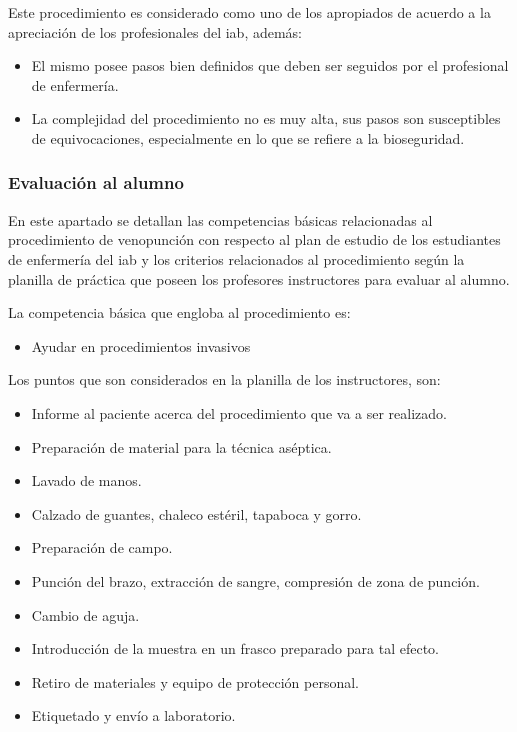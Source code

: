 Este procedimiento es considerado como uno de los apropiados de acuerdo a la
apreciación de los profesionales del \Gls{iab}, además: 

\begin{itemize}
\item El mismo posee pasos bien definidos que deben ser seguidos por el
    profesional de enfermería.
\item La complejidad del procedimiento no es muy alta, sus pasos son
    susceptibles de equivocaciones, especialmente en lo que se refiere a la
    bioseguridad. 
\end{itemize}



\subsubsection{Evaluación al alumno}


En este apartado se detallan las competencias básicas relacionadas al procedimiento
de venopunción con respecto al plan de estudio de los estudiantes 
de enfermería del \Gls{iab} y los criterios relacionados al procedimiento según la planilla de
práctica que poseen los profesores instructores para evaluar al alumno.

La competencia básica que engloba al procedimiento es:

\begin{itemize}
\item Ayudar en procedimientos invasivos
\end{itemize}

Los puntos que son considerados en la planilla de los instructores, son:

\begin{itemize}
\item Informe al paciente acerca del procedimiento que va a ser
    realizado.
\item Preparación de material para la técnica aséptica.
\item Lavado de manos.
\item Calzado de guantes, chaleco estéril, tapaboca y gorro.
\item Preparación de campo.
\item Punción del brazo, extracción de sangre, compresión de zona de punción.
\item Cambio de aguja.
\item Introducción de la muestra en un frasco preparado para tal efecto.
\item Retiro de materiales y equipo de protección personal.
\item Etiquetado y envío a laboratorio.
\end{itemize}

